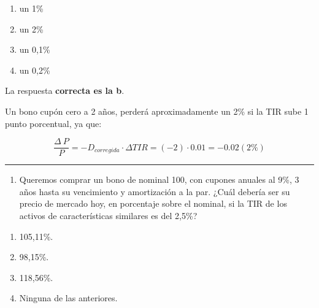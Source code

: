 \documentclass[
  letterpaper,
  DIV=11,
  numbers=noendperiod]{scrreprt}
\providecommand{\tightlist}{%
  \setlength{\itemsep}{0pt}\setlength{\parskip}{0pt}}\usepackage{longtable,booktabs,array}
\begin{document}
\begin{enumerate}
\def\labelenumi{\alph{enumi})}
\item
  un 1\%
\item
  un 2\%
\item
  un 0,1\%
\item
  un 0,2\%
\end{enumerate}

\begin{tcolorbox}[enhanced jigsaw, left=2mm, opacityback=0, colback=white, breakable, arc=.35mm, bottomrule=.15mm, rightrule=.15mm, toprule=.15mm, leftrule=.75mm, colframe=quarto-callout-tip-color-frame]
\begin{minipage}[t]{5.5mm}
\textcolor{quarto-callout-tip-color}{\faLightbulb}
\end{minipage}%
\begin{minipage}[t]{\textwidth - 5.5mm}

La respuesta \textbf{correcta es la b}.

Un bono cupón cero a 2 años, perderá aproximadamente un 2\% si la TIR
sube 1 punto porcentual, ya que:

\[\frac{\Delta\ P}{P}=-D_{corregida}\cdot\Delta TIR=(-2)\cdot 0.01=-0.02(2\%)\]

\end{minipage}%
\end{tcolorbox}

\begin{center}\rule{0.5\linewidth}{0.5pt}\end{center}

\begin{enumerate}
\def\labelenumi{\arabic{enumi}.}
\setcounter{enumi}{100}
\tightlist
\item
  Queremos comprar un bono de nominal 100, con cupones anuales al 9\%, 3
  años hasta su vencimiento y amortización a la par. ¿Cuál debería ser
  su precio de mercado hoy, en porcentaje sobre el nominal, si la TIR de
  los activos de características similares es del 2,5\%?
\end{enumerate}

\begin{enumerate}
\def\labelenumi{\alph{enumi})}
\item
  105,11\%.
\item
  98,15\%.
\item
  118,56\%.
\item
  Ninguna de las anteriores.
\end{enumerate}
\end{document}
